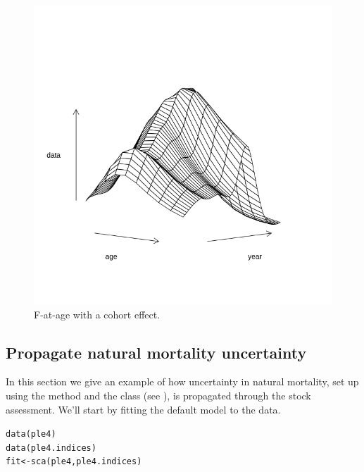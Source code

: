 \documentclass[a4paper,english,10pt]{article}\usepackage[]{graphicx}\usepackage[]{color}
\makeatletter
\newcommand{\hlstd}[1]{\textcolor[rgb]{0.196,0.196,0.196}{#1}}%
\newcommand{\hlkwb}[1]{\textcolor[rgb]{0.627,0,0.314}{#1}}%
\newcommand{\hlkwd}[1]{\textcolor[rgb]{0.78,0.227,0.412}{#1}}%
\newenvironment{kframe}{%
 \def\at@end@of@kframe{}%
 \ifinner\ifhmode%
  \def\at@end@of@kframe{\end{minipage}}%
  \begin{minipage}{\columnwidth}%
 \fi\fi%
 \def\FrameCommand##1{\hskip\@totalleftmargin \hskip-\fboxsep
 \colorbox{shadecolor}{##1}\hskip-\fboxsep
     \hskip-\linewidth \hskip-\@totalleftmargin \hskip\columnwidth}%
 \MakeFramed {\advance\hsize-\width
   \@totalleftmargin\z@ \linewidth\hsize
   \@setminipage}}%
 {\par\unskip\endMakeFramed%
 \at@end@of@kframe}
\newenvironment{knitrout}{}{} %
\makeatother
\begin{document}
\begin{knitrout}
\color{fgcolor}\begin{figure}[H]

{\centering \includegraphics[width=.9\linewidth]{figure/coh-1} 

}

\caption[F-at-age with a cohort effect]{F-at-age with a cohort effect.}\label{fig:coh}
\end{figure}


\end{knitrout}

\subsection{Propagate natural mortality uncertainty}

In this section we give an example of how uncertainty in natural mortality, set up using the  method and the class  (see ), is propagated through the stock assessment. We'll start by fitting the default model to the data.

\begin{knitrout}
\color{fgcolor}\begin{kframe}
\begin{alltt}
\hlkwd{data}\hlstd{(ple4)}
\hlkwd{data}\hlstd{(ple4.indices)}
\hlstd{fit} \hlkwb{<-} \hlkwd{sca}\hlstd{(ple4, ple4.indices)}
\end{alltt}
\end{kframe}
\end{knitrout}
\end{document}
